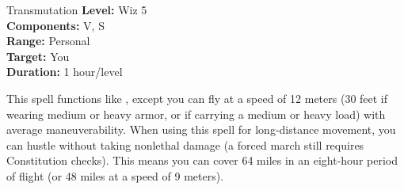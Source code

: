 {Transmutation}
{
	\textbf{Level:}
	Wiz 5\\
	\textbf{Components:}
	V, S\\
	\textbf{Range:}
	Personal\\
	\textbf{Target:}
	You\\
	\textbf{Duration:}
	1 hour/level\\
}
{
	This spell functions like , except you can fly at a speed of 12 meters (30 feet if wearing medium or heavy armor, or if carrying a medium or heavy load) with average maneuverability. When using this spell for long-distance movement, you can hustle without taking nonlethal damage (a forced march still requires Constitution checks). This means you can cover 64 miles in an eight-hour period of flight (or 48 miles at a speed of 9 meters).

}

